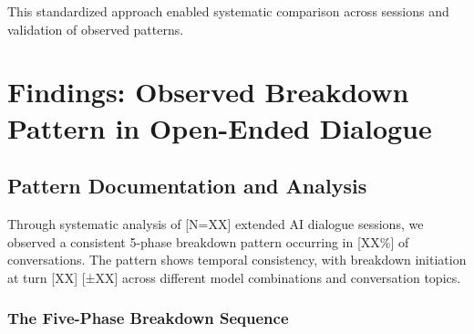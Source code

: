 \documentclass[11pt,letterpaper]{article}
\newcommand{\totalSessions}{[N=XX]} %
\newcommand{\breakdownPercentage}{[XX\%]} %
\newcommand{\meanBreakdownTurn}{[XX]} %
\newcommand{\stdBreakdownTurn}{[±XX]} %
\begin{document}
This standardized approach enabled systematic comparison across sessions and validation of observed patterns.

\section{Findings: Observed Breakdown Pattern in Open-Ended Dialogue}

\subsection{Pattern Documentation and Analysis}

Through systematic analysis of \totalSessions{} extended AI dialogue sessions, we observed a consistent 5-phase breakdown pattern occurring in \breakdownPercentage{} of conversations. The pattern shows temporal consistency, with breakdown initiation at turn \meanBreakdownTurn{} \stdBreakdownTurn{} across different model combinations and conversation topics.

\subsubsection{The Five-Phase Breakdown Sequence}
\end{document}

